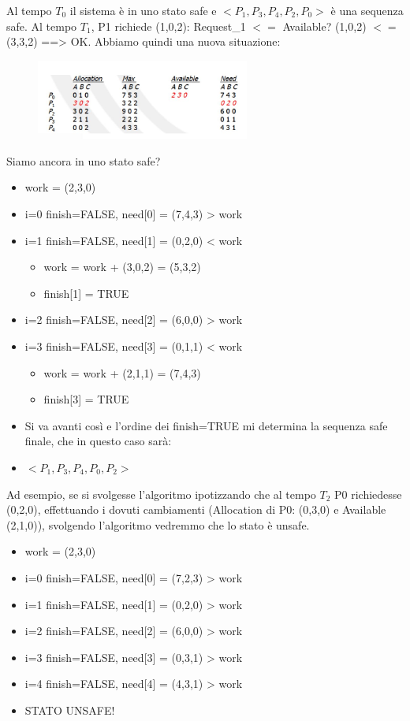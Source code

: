 \documentclass[a4paper]{article}
\begin{document}
Al tempo $T_0$ il sistema è in uno stato safe e $<P_1, P_3, P_4, P_2, P_0>$ è una sequenza safe. \newline
Al tempo $T_1$, P1 richiede (1,0,2): Request\_1 $<=$ Available? (1,0,2) $<=$ (3,3,2) ==> OK. Abbiamo quindi una nuova situazione:
\begin{figure}[htb]
   \includegraphics[width=7cm]{img/bank1.JPG}
\end{figure}
\newpage
Siamo ancora in uno stato safe?
\begin{itemize}
   \item work = (2,3,0)
   \item i=0 finish=FALSE, need[0] = (7,4,3) > work
   \item i=1 finish=FALSE, need[1] = (0,2,0) < work
         \begin{itemize}
            \item work = work + (3,0,2) = (5,3,2)
            \item finish[1] = TRUE
         \end{itemize}
   \item i=2 finish=FALSE, need[2] = (6,0,0) > work
   \item i=3 finish=FALSE, need[3] = (0,1,1) < work
         \begin{itemize}
            \item work = work + (2,1,1) = (7,4,3)
            \item finish[3] = TRUE
         \end{itemize}
   \item Si va avanti così e l'ordine dei finish=TRUE mi determina la sequenza safe finale, che in questo caso sarà:
   \item $<P_1, P_3, P_4, P_0, P_2>$
\end{itemize}

Ad esempio, se si svolgesse l'algoritmo ipotizzando che al tempo $T_2$ P0 richiedesse (0,2,0), effettuando i dovuti cambiamenti (Allocation di P0: (0,3,0) e Available (2,1,0)), svolgendo l'algoritmo vedremmo che lo stato è unsafe.
\begin{itemize}
   \item work = (2,3,0)
   \item i=0 finish=FALSE, need[0] = (7,2,3) > work
   \item i=1 finish=FALSE, need[1] = (0,2,0) > work
   \item i=2 finish=FALSE, need[2] = (6,0,0) > work
   \item i=3 finish=FALSE, need[3] = (0,3,1) > work
   \item i=4 finish=FALSE, need[4] = (4,3,1) > work
   \item STATO UNSAFE!
\end{itemize}
\end{document}
